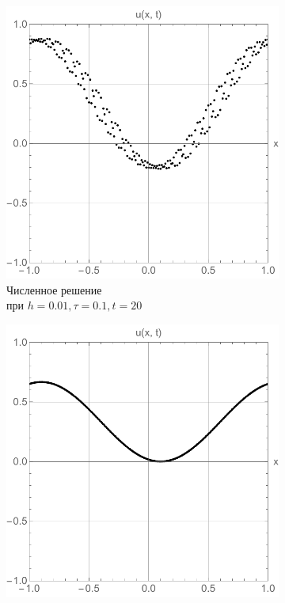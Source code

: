 \documentclass[12pt, a4paper]{article}
\begin{document}
\begin{figure}[!hp]
	\centering
	\begin{subfigure}[t]{0.32\textwidth}
		\centering
		\includegraphics[width=\textwidth]{res2_2}
		\caption{Численное решение  \\при $h = 0.01, \tau = 0.1, t = 20$ }
		\label{test1}
	\end{subfigure}
	\hfill
	\begin{subfigure}[t]{0.32\textwidth}
		\centering
		\includegraphics[width=\textwidth]{res2_1}

\end{subfigure}
\end{figure}
\end{document}
